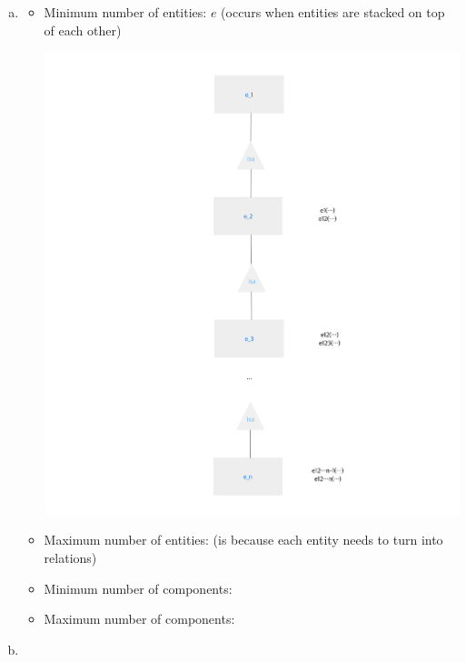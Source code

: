 \documentclass[12pt]{article}
\begin{document}
\begin{enumerate}[1.]
\begin{enumerate}[a)]
        \item

        \begin{itemize}
            \item Minimum number of entities: $e$ (occurs when entities are stacked on top of each other)

            \begin{center}
            \includegraphics[width=0.7\linewidth]{images/worksheet_14_solution_79.png}
            \end{center}

            \item Maximum number of entities: (is because each entity needs to turn into relations)
            \item Minimum number of components:
            \item Maximum number of components:
        \end{itemize}

        \item
    \end{enumerate}

\end{enumerate}
\end{document}
